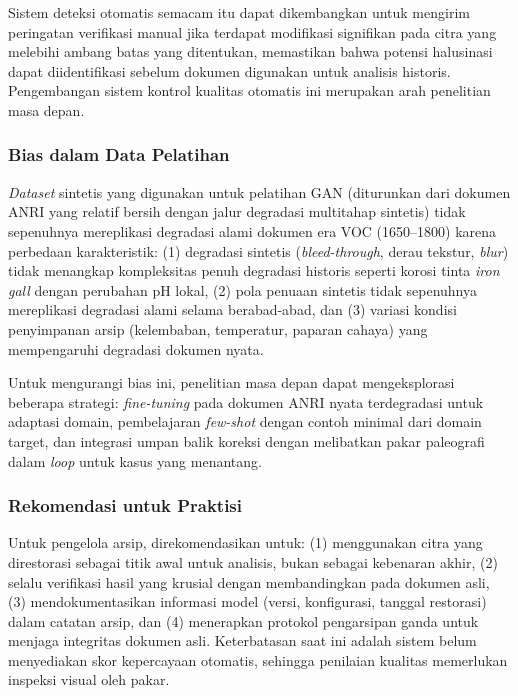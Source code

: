 \documentclass[journal]{IEEEtran}
\begin{document}
Sistem deteksi otomatis semacam itu dapat dikembangkan untuk mengirim peringatan verifikasi manual jika terdapat modifikasi signifikan pada citra yang melebihi ambang batas yang ditentukan, memastikan bahwa potensi halusinasi dapat diidentifikasi sebelum dokumen digunakan untuk analisis historis. Pengembangan sistem kontrol kualitas otomatis ini merupakan arah penelitian masa depan.

\subsubsection{Bias dalam Data Pelatihan}

\textit{Dataset} sintetis yang digunakan untuk pelatihan GAN (diturunkan dari dokumen ANRI yang relatif bersih dengan jalur degradasi multitahap sintetis) tidak sepenuhnya mereplikasi degradasi alami dokumen era VOC (1650--1800) karena perbedaan karakteristik: (1) degradasi sintetis (\textit{bleed-through}, derau tekstur, \textit{blur}) tidak menangkap kompleksitas penuh degradasi historis seperti korosi tinta \textit{iron gall} dengan perubahan pH lokal, (2) pola penuaan sintetis tidak sepenuhnya mereplikasi degradasi alami selama berabad-abad, dan (3) variasi kondisi penyimpanan arsip (kelembaban, temperatur, paparan cahaya) yang mempengaruhi degradasi dokumen nyata.

Untuk mengurangi bias ini, penelitian masa depan dapat mengeksplorasi beberapa strategi: \textit{fine-tuning} pada dokumen ANRI nyata terdegradasi untuk adaptasi domain, pembelajaran \textit{few-shot} dengan contoh minimal dari domain target, dan integrasi umpan balik koreksi dengan melibatkan pakar paleografi dalam \textit{loop} untuk kasus yang menantang.

\subsubsection{Rekomendasi untuk Praktisi}

Untuk pengelola arsip, direkomendasikan untuk: (1) menggunakan citra yang direstorasi sebagai titik awal untuk analisis, bukan sebagai kebenaran akhir, (2) selalu verifikasi hasil yang krusial dengan membandingkan pada dokumen asli, (3) mendokumentasikan informasi model (versi, konfigurasi, tanggal restorasi) dalam catatan arsip, dan (4) menerapkan protokol pengarsipan ganda untuk menjaga integritas dokumen asli. Keterbatasan saat ini adalah sistem belum menyediakan skor kepercayaan otomatis, sehingga penilaian kualitas memerlukan inspeksi visual oleh pakar.
\end{document}
